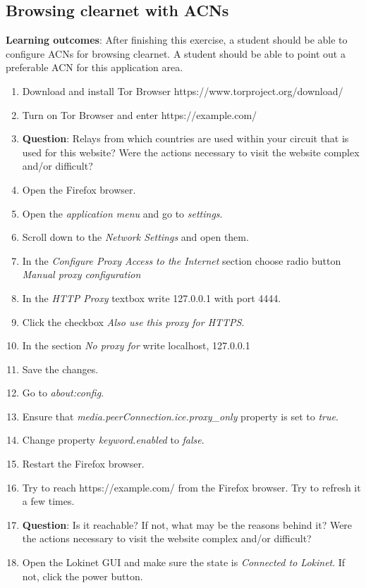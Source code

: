 \subsection{Browsing clearnet with ACNs}
\textbf{Learning outcomes}: After finishing this exercise, a student should be able to configure ACNs for browsing clearnet. A student should be able to point out a preferable ACN for this application area.
\begin{enumerate}
    \item Download and install Tor Browser https://www.torproject.org/download/
    \item Turn on Tor Browser and enter https://example.com/
    \item \textbf{Question}: Relays from which countries are used within your circuit that is used for this website? Were the actions necessary to visit the website complex and/or difficult?
    \item Open the Firefox browser.
    \item Open the \textit{application menu} and go to \textit{settings}.
    \item Scroll down to the \textit{Network Settings} and open them.
    \item In the \textit{Configure Proxy Access to the Internet} section choose radio button \textit{Manual proxy configuration }
    \item In the \textit{HTTP Proxy} textbox write 127.0.0.1 with port 4444.
    \item Click the checkbox \textit{Also use this proxy for HTTPS}.
    \item In the section \textit{No proxy for} write localhost, 127.0.0.1
    \item Save the changes.
    \item Go to \textit{about:config}.
    \item Ensure that \textit{media.peerConnection.ice.proxy\_only} property is set to \textit{true}.
    \item Change property \textit{keyword.enabled} to \textit{false}.
    \item Restart the Firefox browser.
    \item Try to reach https://example.com/ from the Firefox browser. Try to refresh it a few times.
    \item \textbf{Question}: Is it reachable? If not, what may be the reasons behind it? Were the actions necessary to visit the website complex and/or difficult?
    \item Open the Lokinet GUI and make sure the state is \textit{Connected to Lokinet}. If not, click the power button.

\end{enumerate}

